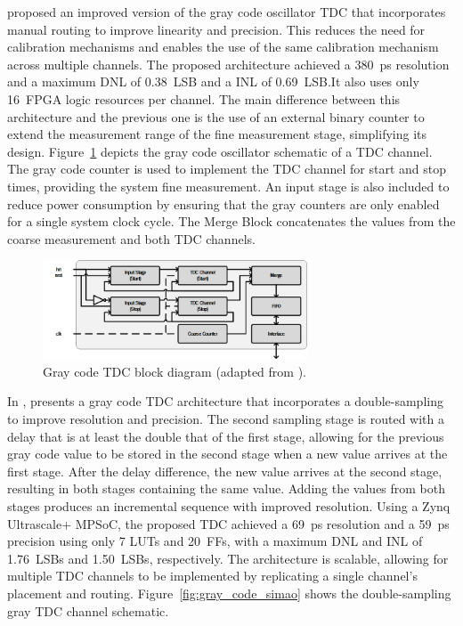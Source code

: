 \citet{gray_code_machado} proposed an improved version of the gray code oscillator \gls{TDC} that incorporates manual routing to improve linearity and precision. This reduces the need for calibration mechanisms and enables the use of the same calibration mechanism across multiple channels. The proposed architecture achieved a 380~ps resolution and a maximum \gls{DNL} of 0.38~\gls{LSB} and a \gls{INL} of 0.69~\gls{LSB}.It also uses only 16~\gls{FPGA} logic resources per channel. The main difference between this architecture and the previous one is the use of an external binary counter to extend the measurement range of the fine measurement stage, simplifying its design. Figure~\ref{fig:gray_code_rui} depicts the gray code oscillator schematic of a \gls{TDC} channel. The gray code counter is used to implement the \gls{TDC} channel for start and stop times, providing the system fine measurement. An input stage is also included to reduce power consumption by ensuring that the gray counters are only enabled for a single system clock cycle. The Merge Block concatenates the values from the coarse measurement and both \gls{TDC} channels.

\begin{figure}[ht!]
    \centering
  	\includegraphics[width=0.7\textwidth]{img/02_StateofArt/gray_code_rui_bd.png}
    \caption{Gray code TDC block diagram (adapted from \citep{gray_code_machado}).}
    \label{fig:gray_code_rui}
\end{figure}

In \citeyear{gray_code_araujo}, \citet{gray_code_araujo} presents a gray code \gls{TDC} architecture that incorporates a double-sampling to improve resolution and precision. The second sampling stage is routed with a delay that is at least the double that of the first stage, allowing for the previous gray code value to be stored in the second stage when a new value arrives at the first stage. After the delay difference, the new value arrives at the second stage, resulting in both stages containing the same value. Adding the values from both stages produces an incremental sequence with improved resolution. Using a Zynq Ultrascale+ MPSoC, the proposed \gls{TDC} achieved a 69~ps resolution and a 59~ps precision using only 7 \glspl{LUT} and 20~\glspl{FF}, with a maximum \gls{DNL} and \gls{INL} of 1.76~\glspl{LSB} and 1.50~\glspl{LSB}, respectively. The architecture is scalable, allowing for multiple \gls{TDC} channels to be implemented by replicating a single channel's placement and routing. Figure~\ref{fig:gray_code_simao} shows the double-sampling gray \gls{TDC} channel schematic.

